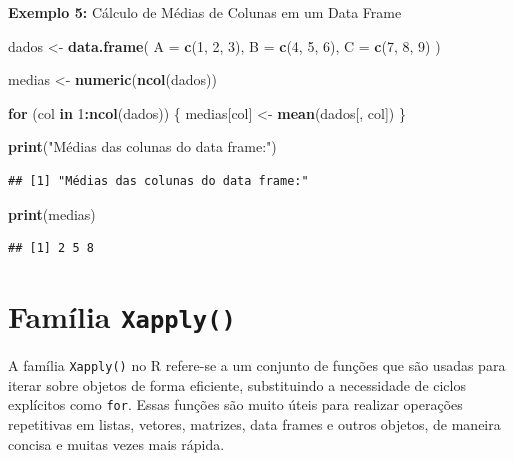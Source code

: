 \documentclass[
]{book}
\newenvironment{Shaded}{\begin{snugshade}}{\end{snugshade}}
\newcommand{\AttributeTok}[1]{\textcolor[rgb]{0.13,0.29,0.53}{#1}}
\newcommand{\ControlFlowTok}[1]{\textcolor[rgb]{0.13,0.29,0.53}{\textbf{#1}}}
\newcommand{\DecValTok}[1]{\textcolor[rgb]{0.00,0.00,0.81}{#1}}
\newcommand{\FunctionTok}[1]{\textcolor[rgb]{0.13,0.29,0.53}{\textbf{#1}}}
\newcommand{\NormalTok}[1]{#1}
\newcommand{\OtherTok}[1]{\textcolor[rgb]{0.56,0.35,0.01}{#1}}
\newcommand{\SpecialCharTok}[1]{\textcolor[rgb]{0.81,0.36,0.00}{\textbf{#1}}}
\newcommand{\StringTok}[1]{\textcolor[rgb]{0.31,0.60,0.02}{#1}}
\theoremstyle{definition}
\theoremstyle{definition}
\theoremstyle{definition}
\theoremstyle{definition}
\theoremstyle{remark}
\begin{document}
\textbf{Exemplo 5:} Cálculo de Médias de Colunas em um Data Frame

\begin{Shaded}
\begin{Highlighting}[]
\NormalTok{dados }\OtherTok{\textless{}{-}} \FunctionTok{data.frame}\NormalTok{(}
\AttributeTok{A =} \FunctionTok{c}\NormalTok{(}\DecValTok{1}\NormalTok{, }\DecValTok{2}\NormalTok{, }\DecValTok{3}\NormalTok{),}
\AttributeTok{B =} \FunctionTok{c}\NormalTok{(}\DecValTok{4}\NormalTok{, }\DecValTok{5}\NormalTok{, }\DecValTok{6}\NormalTok{),}
\AttributeTok{C =} \FunctionTok{c}\NormalTok{(}\DecValTok{7}\NormalTok{, }\DecValTok{8}\NormalTok{, }\DecValTok{9}\NormalTok{)}
\NormalTok{)}

\NormalTok{medias }\OtherTok{\textless{}{-}} \FunctionTok{numeric}\NormalTok{(}\FunctionTok{ncol}\NormalTok{(dados))}

\ControlFlowTok{for}\NormalTok{ (col }\ControlFlowTok{in} \DecValTok{1}\SpecialCharTok{:}\FunctionTok{ncol}\NormalTok{(dados)) \{}
\NormalTok{  medias[col] }\OtherTok{\textless{}{-}} \FunctionTok{mean}\NormalTok{(dados[, col])}
\NormalTok{\}}

\FunctionTok{print}\NormalTok{(}\StringTok{"Médias das colunas do data frame:"}\NormalTok{)}
\end{Highlighting}
\end{Shaded}

\begin{verbatim}
## [1] "Médias das colunas do data frame:"
\end{verbatim}

\begin{Shaded}
\begin{Highlighting}[]
\FunctionTok{print}\NormalTok{(medias)}
\end{Highlighting}
\end{Shaded}

\begin{verbatim}
## [1] 2 5 8
\end{verbatim}

\chapter{\texorpdfstring{Família \texttt{Xapply()}}{Família Xapply()}}\label{famuxedlia-xapply}

A família \texttt{Xapply()} no R refere-se a um conjunto de funções que são usadas para iterar sobre objetos de forma eficiente, substituindo a necessidade de ciclos explícitos como \texttt{for}. Essas funções são muito úteis para realizar operações repetitivas em listas, vetores, matrizes, data frames e outros objetos, de maneira concisa e muitas vezes mais rápida.
\end{document}
